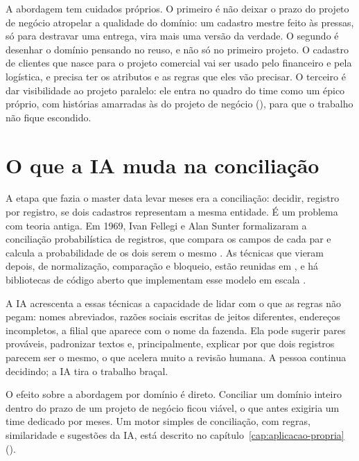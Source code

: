 A abordagem tem cuidados próprios. O primeiro é não deixar o prazo do projeto de negócio
atropelar a qualidade do domínio: um cadastro mestre feito às pressas, só para destravar
uma entrega, vira mais uma versão da verdade. O segundo é desenhar o domínio pensando no
reuso, e não só no primeiro projeto. O cadastro de clientes que nasce para o projeto
comercial vai ser usado pelo financeiro e pela logística, e precisa ter os atributos e as
regras que eles vão precisar. O terceiro é dar visibilidade ao projeto paralelo: ele entra
no quadro do time como um épico próprio, com histórias amarradas às do projeto de negócio
(), para que o trabalho não fique escondido.


\section{O que a IA muda na conciliação}
\label{sec:master-data-ia}

A etapa que fazia o master data levar meses era a conciliação: decidir, registro por
registro, se dois cadastros representam a mesma entidade. É um problema com teoria antiga.
Em 1969, Ivan Fellegi e Alan Sunter formalizaram a conciliação probabilística de registros,
que compara os campos de cada par e calcula a probabilidade de os dois serem o mesmo
\parencite{fellegi1969}. As técnicas que vieram depois, de normalização, comparação e
bloqueio, estão reunidas em \textcite{christen2012}, e há bibliotecas de código aberto
que implementam esse modelo em escala \parencite{linacre2022}.

A IA acrescenta a essas técnicas a capacidade de lidar com o que as regras não pegam: nomes
abreviados, razões sociais escritas de jeitos diferentes, endereços incompletos, a filial
que aparece com o nome da fazenda. Ela pode sugerir pares prováveis, padronizar textos e,
principalmente, explicar por que dois registros parecem ser o mesmo, o que acelera muito
a revisão humana. A pessoa continua decidindo; a IA tira o trabalho braçal.


O efeito sobre a abordagem por domínio é direto. Conciliar um domínio inteiro dentro do
prazo de um projeto de negócio ficou viável, o que antes exigiria um time dedicado por
meses. Um motor simples de conciliação, com regras, similaridade e sugestões da IA, está
descrito no capítulo~\ref{cap:aplicacao-propria} ().

